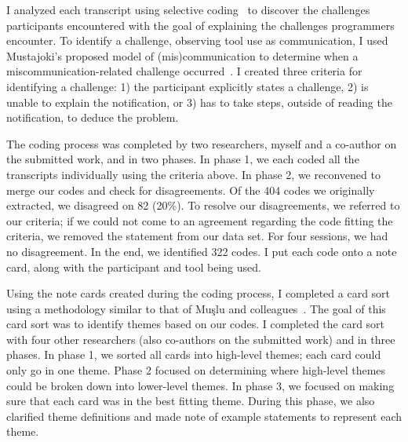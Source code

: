 \documentclass{llncs}
\begin{document}
I analyzed each transcript using selective coding~\cite{corbin2014basics} to discover the challenges participants encountered with the goal of explaining the challenges programmers encounter. 
To identify a challenge, observing tool use as communication, I used Mustajoki's proposed model of (mis)communication to determine when a miscommunication-related challenge occurred~\cite{mustajoki2008modelling}. 
I created three criteria for identifying a challenge: 1) the participant explicitly states a challenge, 2) is unable to explain the notification, or 3) has to take steps, outside of reading the notification, to deduce the problem.

The coding process was completed by two researchers, myself and a co-author on the submitted work, and in two phases. In phase 1, we each coded all the transcripts individually using the criteria above. In phase 2, we reconvened to merge our codes and check for disagreements. Of the 404 codes we originally extracted, we disagreed on 82 (20\%). 
To resolve our disagreements, we referred to our criteria; if we could not come to an agreement regarding the code fitting the criteria, we removed the statement from our data set. For four sessions, we had no disagreement.
In the end, we identified 322 codes. I put each code onto a note card, along with the participant and tool being used. 

Using the note cards created during the coding process, I completed a card sort using a methodology similar to that of Mu\c{s}lu and colleagues~\cite{Muslu:2014:Transition}. 
The goal of this card sort was to identify themes based on our codes. 
I completed the card sort with four other researchers (also co-authors on the submitted work) and in three phases.
In phase 1, we sorted all cards into high-level themes; each card could only go in one theme. 
Phase 2 focused on determining where high-level themes could be broken down into lower-level themes.
In phase 3, we focused on making sure that each card was in the best fitting theme. During this phase, we also clarified theme definitions and made note of example statements to represent each theme.

\end{document}

